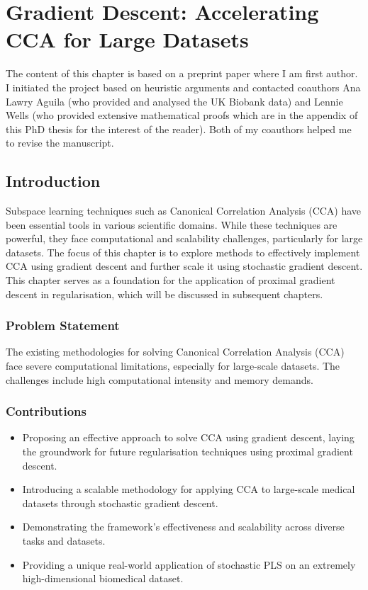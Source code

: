 \chapter{Gradient Descent: Accelerating CCA for Large Datasets}\label{ch:gradient_descent}
The content of this chapter is based on a preprint paper where I am first author.
I initiated the project based on heuristic arguments and contacted coauthors Ana Lawry Aguila (who provided and analysed the UK Biobank data) and Lennie Wells (who provided extensive mathematical proofs which are in the appendix of this PhD thesis for the interest of the reader).
Both of my coauthors helped me to revise the manuscript.
\minitoc

\section{Introduction}

Subspace learning techniques such as Canonical Correlation Analysis (CCA) have been essential tools in various scientific domains.
While these techniques are powerful, they face computational and scalability challenges, particularly for large datasets.
The focus of this chapter is to explore methods to effectively implement CCA using gradient descent and further scale it using stochastic gradient descent.
This chapter serves as a foundation for the application of proximal gradient descent in regularisation, which will be discussed in subsequent chapters.

\subsection{Problem Statement}

The existing methodologies for solving Canonical Correlation Analysis (CCA) face severe computational limitations, especially for large-scale datasets.
The challenges include high computational intensity and memory demands.

\subsection{Contributions}


\begin{itemize}
  \item Proposing an effective approach to solve CCA using gradient descent, laying the groundwork for future regularisation techniques using proximal gradient descent.
  \item Introducing a scalable methodology for applying CCA to large-scale medical datasets through stochastic gradient descent.
  \item Demonstrating the framework's effectiveness and scalability across diverse tasks and datasets.
  \item Providing a unique real-world application of stochastic PLS on an extremely high-dimensional biomedical dataset.
\end{itemize}

